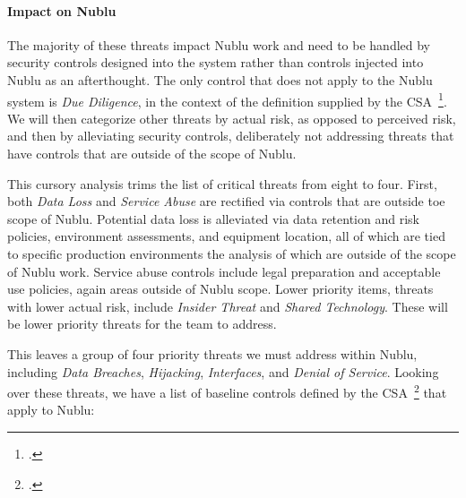 \documentclass[10pt,letterpaper]{article}
\begin{document}
\paragraph{Impact on Nublu}
The majority of these threats impact Nublu work and need to be handled by security controls designed into the system rather than controls injected into Nublu as an afterthought.  The only control that does not apply to the Nublu system is {\sl Due Diligence}, in the context of the definition supplied by the CSA~\footcite{csa-noni:13}.  We will then categorize other threats by actual risk, as opposed to perceived risk, and then by alleviating security controls, deliberately not addressing threats that have controls that are outside of the scope of Nublu.

This cursory analysis trims the list of critical threats from eight to four.  First, both {\sl Data Loss} and {\sl Service Abuse} are rectified via controls that are outside toe scope of Nublu.  Potential data loss is alleviated via data retention and risk policies, environment assessments, and equipment location, all of which are tied to specific production environments the analysis of which are outside of the scope of Nublu work.  Service abuse controls include legal preparation and acceptable use policies, again areas outside of Nublu scope.  Lower priority items, threats with lower actual risk, include {\sl Insider Threat} and {\sl Shared Technology}.  These will be lower priority threats for the team to address.

This leaves a group of four priority threats we must address within Nublu, including {\sl Data Breaches}, {\sl Hijacking}, {\sl Interfaces}, and {\sl Denial of Service}.  Looking over these threats, we have a list of baseline controls defined by the CSA~\footcite{csa-ccmv3:13} that apply to Nublu:
\end{document}
